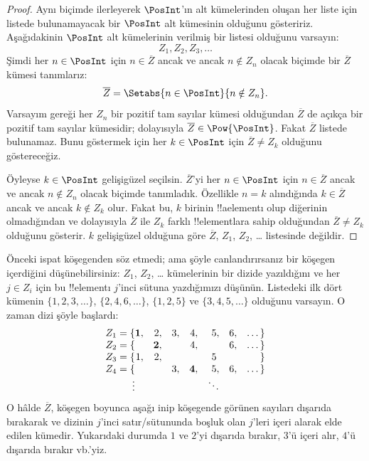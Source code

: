 \documentclass[../../../include/open-logic-section]{subfiles}
\begin{document}
\begin{proof}
Aynı biçimde ilerleyerek $\PosInt$'ın alt kümelerinden oluşan her liste için listede
bulunamayacak bir $\PosInt$ alt kümesinin olduğunu gösteririz. Aşağıdakinin
$\PosInt$ alt kümelerinin verilmiş bir listesi olduğunu varsayın:
\[
Z_{1}, Z_{2}, Z_{3}, \dots
\]
Şimdi her $n\in\PosInt$ için $n\in\overline{Z}$ ancak ve ancak $n\notin Z_n$
olacak biçimde bir $\overline{Z}$ kümesi tanımlarız:
\[
\overline{Z} = \Setabs{n \in \PosInt}{n \notin Z_n}.
\]
Varsayım gereği her $Z_n$ bir pozitif tam sayılar kümesi olduğundan
$\overline{Z}$ de açıkça bir pozitif tam sayılar kümesidir; dolayısıyla
$\overline{Z}\in\Pow{\PosInt}$. Fakat $\overline{Z}$ listede bulunamaz.
Bunu göstermek için her $k\in\PosInt$ için $\overline{Z}\neq Z_k$ olduğunu
göstereceğiz.

Öyleyse $k\in\PosInt$ gelişigüzel seçilsin. $\overline{Z}$'yi her
$n\in\PosInt$ için $n\in\overline{Z}$ ancak ve ancak $n\notin Z_n$ olacak
biçimde tanımladık. Özellikle $n=k$ alındığında $k\in\overline{Z}$ ancak ve
ancak $k\notin Z_k$ olur. Fakat bu, $k$ birinin !!a{element}ı olup diğerinin
olmadığından ve dolayısıyla $\overline{Z}$ ile $Z_k$ farklı !!{element}lara
sahip olduğundan $\overline{Z}\neq Z_k$ olduğunu gösterir. $k$ gelişigüzel
olduğuna göre $\overline{Z}$, $Z_1$, $Z_2$, \dots{} listesinde değildir.
\end{proof}

\begin{explain}
Önceki ispat köşegenden söz etmedi; ama şöyle canlandırırsanız bir köşegen
içerdiğini düşünebilirsiniz: $Z_1$, $Z_2$, \dots{} kümelerinin bir dizide
yazıldığını ve her $j\in Z_i$ için bu !!{element}ı $j$'inci sütuna yazdığımızı
düşünün. Listedeki ilk dört kümenin $\{1,2,3,\dots\}$, $\{2,4,6,\dots\}$,
$\{1,2,5\}$ ve $\{3,4,5,\dots\}$ olduğunu varsayın. O zaman dizi şöyle
başlardı:
\[
\begin{array}{r@{}rrrrrrr}
  Z_1 = \{ & \mathbf{1}, & 2, & 3, & 4, & 5, & 6, & \dots\}\\
  Z_2 = \{ &  & \mathbf{2}, &  & 4, &  & 6, & \dots\}\\
  Z_3 = \{ & 1, & 2, &  &  & 5\phantom{,} &  & \}\\
  Z_4 = \{ &  &  & 3, & \mathbf{4}, & 5, & 6, & \dots\}\\
  \vdots & & & & & \ddots
\end{array}
\]
O hâlde $\overline{Z}$, köşegen boyunca aşağı inip köşegende görünen
sayıları dışarıda bırakarak ve dizinin $j$'inci satır/sütununda boşluk olan
$j$'leri içeri alarak elde edilen kümedir. Yukarıdaki durumda $1$ ve $2$'yi
dışarıda bırakır, $3$'ü içeri alır, $4$'ü dışarıda bırakır vb.'yiz.
\end{explain}
\end{document}
